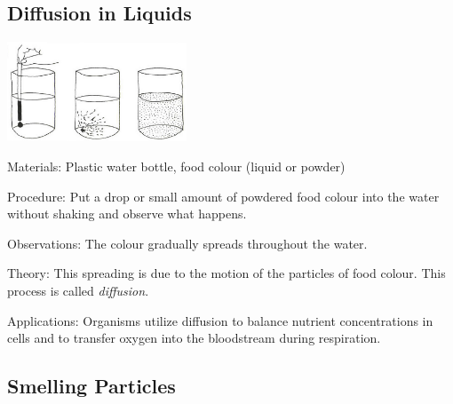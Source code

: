 \begin{multicols}{2}
\subsection{Diffusion in Liquids}

\begin{center}
\includegraphics[width=0.4\textwidth]{./img/vso/diffusion.png}
\end{center}

\begin{description*}
\item[Materials:]{Plastic water bottle, food colour (liquid or powder)}
\item[Procedure:]{Put a drop or small amount of powdered food colour into the water without shaking and observe what happens.}
\item[Observations:]{The colour gradually spreads throughout the water.}
\item[Theory:]{This spreading is due to the motion of the particles of food colour. This process is called \emph{diffusion}.}
\item[Applications:]{Organisms utilize diffusion to balance nutrient concentrations in cells and to transfer oxygen into the bloodstream during respiration.}
\end{description*}

\subsection{Smelling Particles}


\end{multicols}
